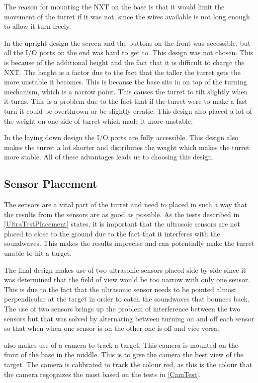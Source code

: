 The reason for mounting the NXT on the base is that it would limit the movement
of the turret if it was not, since the wires available is not long enough to
allow it turn freely.\nl

In the upright design the screen and the buttons on the front
was accessible, but all the I/O ports on the end was hard to get to. This
design was not chosen. This is because of the additional height and the fact
that it is difficult to charge the NXT. The height is a factor due to the fact
that the taller the turret gets the more unstable it becomes. This is because
the base sits in on top of the turning mechanism, which is a narrow point. This
causes the turret to tilt slightly when it turns. This is a problem due to the
fact that if the turret were to make a fast turn it could be overthrown or be
slightly erratic. This design also placed a lot of the weight on one side of
turret which made it more unstable.\nl

In the laying down design the I/O ports are fully accessible. This design also makes the turret a
lot shorter and distributes the weight which makes the turret more stable. All
of these advantages leads us to choosing this design.

\subsection{Sensor Placement}
The sensors are a vital part of the turret and need to placed in such a way that
the results from the sensors are as good as possible. As the tests described in
\autoref{UltraTestPlacement} states, it is important that the ultrasoic sensors
are not placed to close to the ground due to the fact that it interferes with
the soundwaves. This makes the results imprecise and can potentially make the
turret unable to hit a target.\nl

The final design makes use of two ultrasonic sensors placed side by side since
it was determined that the field of view would be too narrow with only one
sensor. This is due to the fact that the ultrasonic sensor needs to be pointed
almost perpendicular at the target in order to catch the soundwaves that bounces
back. The use of two sensors brings up the problem of interference between the
two sensors but that was solved by alternating between turning on and off each
sensor so that when when one sensor is on the other one is off and vice
versa.\nl

\name also makes use of a camera to track a target. This camera is mounted on
the front of the base in the middle. This is to give the camera the best
view of the target. The camera is calibrated to track the colour red, as this
is the colour that the camera regognizes the most based on the tests in \autoref{CamTest}.

